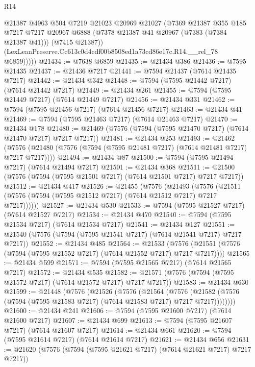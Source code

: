 \begin{lexlean}{R14}
\begin{coremodule}
            @21387
            @4963
            @504
            @7219
            @21023
            @20969
            @21027
            (@7369
              @21387
              @355
              @185
              @7217
              @7217
              @20967
              @6888
              (@7378 @21387 @41 @20967 (@7383 (@7384 @21387 @41)))
              (@7415 @21387))
            (LexLeanPreserve.Cc613c0d4cdf00b8508ed1a73cd86e17c.R14.__rel_78 @6859)))))
@21434 := @7638 @6859
@21435 := @21434 @386
@21436 := @7595 @21435
@21437 := @21436 @7217
@21441 := @7594 @21437 (@7614 @21435 @7217)
@21442 := @21434 @342
@21448 := @7594 (@7595 @21442 @7217) (@7614 @21442 @7217)
@21449 := @21434 @261
@21455 := @7594 (@7595 @21449 @7217) (@7614 @21449 @7217)
@21456 := @21434 @331
@21462 := @7594 (@7595 @21456 @7217) (@7614 @21456 @7217)
@21463 := @21434 @41
@21469 := @7594 (@7595 @21463 @7217) (@7614 @21463 @7217)
@21470 := @21434 @178
@21480 := @21469 (@7576 (@7594 (@7595 @21470 @7217) (@7614 @21470 @7217) @7217 @7217))
@21481 := @21434 @253
@21493 := @21462
    (@7576 (@21480 (@7576 (@7594 (@7595 @21481 @7217) (@7614 @21481 @7217) @7217 @7217))))
@21494 := @21434 @87
@21500 := @7594 (@7595 @21494 @7217) (@7614 @21494 @7217)
@21501 := @21434 @368
@21511 := @21500 (@7576 (@7594 (@7595 @21501 @7217) (@7614 @21501 @7217) @7217 @7217))
@21512 := @21434 @417
@21526 := @21455
    (@7576
      (@21493
        (@7576 (@21511 (@7576 (@7594 (@7595 @21512 @7217) (@7614 @21512 @7217) @7217 @7217))))))
@21527 := @21434 @530
@21533 := @7594 (@7595 @21527 @7217) (@7614 @21527 @7217)
@21534 := @21434 @470
@21540 := @7594 (@7595 @21534 @7217) (@7614 @21534 @7217)
@21541 := @21434 @127
@21551 := @21540 (@7576 (@7594 (@7595 @21541 @7217) (@7614 @21541 @7217) @7217 @7217))
@21552 := @21434 @485
@21564 := @21533
    (@7576 (@21551 (@7576 (@7594 (@7595 @21552 @7217) (@7614 @21552 @7217) @7217 @7217))))
@21565 := @21434 @599
@21571 := @7594 (@7595 @21565 @7217) (@7614 @21565 @7217)
@21572 := @21434 @535
@21582 := @21571 (@7576 (@7594 (@7595 @21572 @7217) (@7614 @21572 @7217) @7217 @7217))
@21583 := @21434 @630
@21599 := @21448
    (@7576
      (@21526
        (@7576
          (@21564
            (@7576
              (@21582 (@7576 (@7594 (@7595 @21583 @7217) (@7614 @21583 @7217) @7217 @7217))))))))
@21600 := @21434 @241
@21606 := @7594 (@7595 @21600 @7217) (@7614 @21600 @7217)
@21607 := @21434 @699
@21613 := @7594 (@7595 @21607 @7217) (@7614 @21607 @7217)
@21614 := @21434 @661
@21620 := @7594 (@7595 @21614 @7217) (@7614 @21614 @7217)
@21621 := @21434 @656
@21631 := @21620 (@7576 (@7594 (@7595 @21621 @7217) (@7614 @21621 @7217) @7217 @7217))

\end{coremodule}
\end{lexlean}
